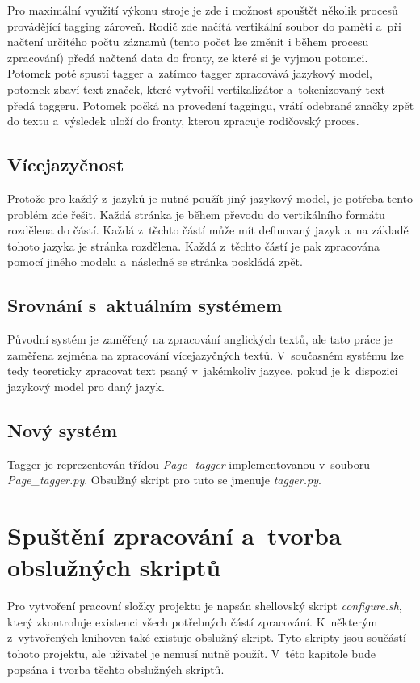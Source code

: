 Pro maximální využití výkonu stroje je zde i možnost spouštět několik procesů provádějící tagging zároveň.
Rodič zde načítá vertikální soubor do paměti a~při načtení určitého počtu záznamů (tento počet lze změnit i během procesu zpracování) předá načtená data
do fronty, ze které si je vyjmou potomci. Potomek poté spustí tagger a~zatímco tagger zpracovává jazykový model,
potomek zbaví text značek, které vytvořil vertikalizátor a~tokenizovaný text předá taggeru. Potomek počká
na provedení taggingu, vrátí odebrané značky zpět do textu a~výsledek uloží do fronty, kterou zpracuje rodičovský proces.

\section{Vícejazyčnost}
Protože pro každý z~jazyků je nutné použít jiný jazykový model, je potřeba tento problém zde řešit.
Každá stránka je během převodu do vertikálního formátu rozdělena do částí. Každá z~těchto částí
může mít definovaný jazyk a~na základě tohoto jazyka je stránka rozdělena. Každá
z~těchto částí je pak zpracována pomocí jiného modelu a~následně se stránka poskládá
zpět.

\section{Srovnání s~aktuálním systémem}
Původní systém je zaměřený na zpracování anglických textů, ale tato práce je zaměřena
zejména na zpracování vícejazyčných textů. V~současném systému lze tedy teoreticky
zpracovat text psaný v~jakémkoliv jazyce, pokud je k~dispozici jazykový model
pro daný jazyk.

\section{Nový systém}
Tagger je reprezentován třídou \textit{Page\_tagger} implementovanou v~souboru \textit{Page\_tagger.py}. Obsulžný skript pro tuto
se jmenuje \textit{tagger.py}.

\chapter{Spuštění zpracování a~tvorba obslužných skriptů}
Pro vytvoření pracovní složky projektu je napsán shellovský skript \textit{configure.sh},
který zkontroluje existenci všech potřebných částí zpracování. K~některým z~vytvořených knihoven
také existuje obslužný skript. Tyto skripty jsou součástí tohoto projektu, ale uživatel je
nemusí nutně použít. V~této kapitole bude popsána i tvorba těchto obslužných skriptů.

